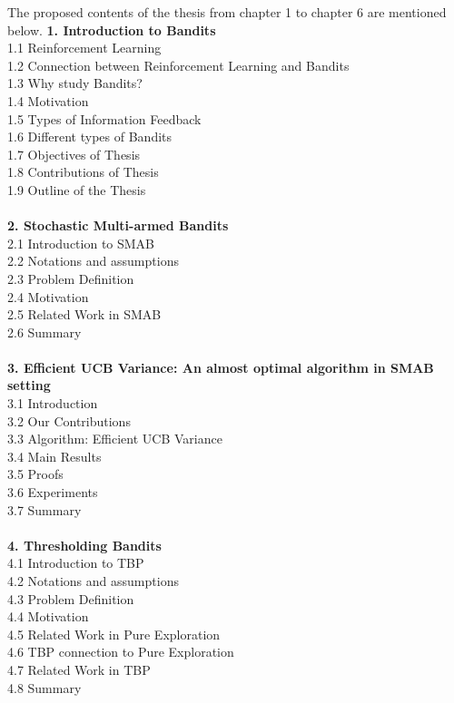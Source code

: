The proposed contents of the thesis from chapter 1 to chapter 6 are mentioned below.
\textbf{1. Introduction to Bandits}\\
1.1 Reinforcement Learning \\
1.2 Connection between Reinforcement Learning and Bandits \\
1.3 Why study Bandits?\\
1.4 Motivation \\
1.5 Types of Information Feedback\\
1.6 Different types of Bandits\\
1.7 Objectives of Thesis\\
1.8 Contributions of Thesis\\
1.9 Outline of the Thesis\\
\\
\textbf{2. Stochastic Multi-armed Bandits} \\
2.1 Introduction to SMAB\\
2.2 Notations and assumptions\\
2.3 Problem Definition\\
2.4 Motivation\\
2.5 Related Work in SMAB\\
2.6 Summary \\
\\
\textbf{3. Efficient UCB Variance: An almost optimal algorithm in SMAB setting}\\
3.1 Introduction\\
3.2 Our Contributions\\
3.3 Algorithm: Efficient UCB Variance\\
3.4 Main Results\\
3.5 Proofs\\
3.6 Experiments\\
3.7 Summary\\
\\
\textbf{4. Thresholding Bandits}\\
4.1 Introduction to TBP\\
4.2 Notations and assumptions\\
4.3 Problem Definition\\
4.4 Motivation\\
4.5 Related Work in Pure Exploration\\
4.6 TBP connection to Pure Exploration\\
4.7 Related Work in TBP \\
4.8 Summary\\
\\
